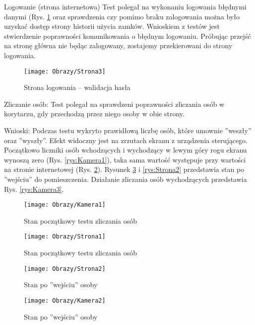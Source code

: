 \begin{enumerate*}
	\item Logowanie (strona internetowa) \newline
	Test polegał na wykonaniu logowania błędnymi danymi (Rys. \ref{rys:Strona3} oraz sprawdzenia czy pomimo braku zalogowania można było uzyskać dostęp strony historii użycia zamków. \newline
	Wnioskiem z testów jest stwierdzenie poprawności komunikowania o błędnym logowaniu. Próbując przejść na stronę główna nie będąc zalogowany, zostajemy przekierowani do strony logowania.
\begin{figure}[ht!]
		\centering
		\texttt{[image: Obrazy/Strona3]}
		\caption{Strona logowania -- walidacja hasła}
		\label{rys:Strona3}
\end{figure}

	\item Zliczanie osób: \newline
	 Test polegał na sprawdzeni poprawności zliczania osób w korytarzu, gdy przechodzą przez niego osoby w obie strony.
	
	Wnioski: Podczas testu wykryto prawidłową liczbę osób, które umownie ''weszły'' oraz ''wyszły''. Efekt widoczny jest na zrzutach ekranu z urządzenia sterującego. Początkowo liczniki osób wchodzących i wychodzący w lewym góry rogu ekranu wynoszą zero (Rys. \ref{rys:Kamera1}), taka sama wartość występuje przy wartości na stronie internetowej (Rys. \ref{rys:Strona1}). Rysunek \ref{rys:Kamera2} i \ref{rys:Strona2} przedstawia stan po ''wejściu'' do pomieszczenia. Działanie zliczania osób wychodzących przedstawia Rys. \ref{rys:Kamera3}.

	\begin{figure}[ht!]
		\vspace{-0.35cm}
	\begin{minipage}{0.3\textwidth}
		\texttt{[image: Obrazy/Kamera1]}
		\caption{Stan początkowy testu zliczania osób }
		\label{rys:Kamera1}
	\end{minipage}
	\hspace{0.01\textwidth}
	\begin{minipage}{0.69\textwidth}
		\vspace{-1cm}
		\texttt{[image: Obrazy/Strona1]}
		\caption{Stan początkowy testu zliczania osób}
		\label{rys:Strona1}
	\end{minipage}
	\end{figure}

	\begin{figure}[ht!]
		\vspace{-1.5cm}
	\begin{minipage}{0.69\textwidth}
		\texttt{[image: Obrazy/Strona2]}
		\caption{Stan po ''wejściu'' osoby }
		\label{rys:Strona2}
	\end{minipage}
	\hspace{0.01\textwidth}
	\begin{minipage}{0.3\textwidth}
		\texttt{[image: Obrazy/Kamera2]}
		\caption{Stan po ''wejściu'' osoby}
		\label{rys:Kamera2}
	\end{minipage}
\end{figure}


\end{enumerate*}
